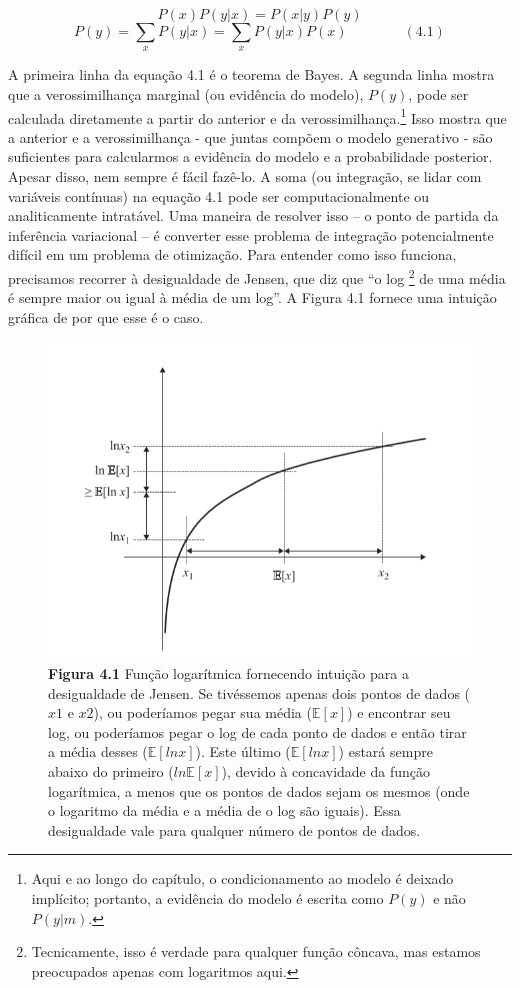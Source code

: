 \documentclass[
  12pt,
]{book}
\begin{document}
\[P(x)P(y|x) = P(x|y)P(y)\]
\[ P(y) = \sum_x P(y|x) = \sum_x P(y|x)P(x) \qquad\qquad (4.1)\]

A primeira linha da equação 4.1 é o teorema de Bayes. A segunda linha
mostra que a verossimilhança marginal (ou evidência do modelo), \(P(y)\),
pode ser calculada diretamente a partir do anterior e da
verossimilhança.\footnote{Aqui e ao longo do capítulo, o condicionamento ao modelo é deixado
  implícito; portanto, a evidência do modelo é escrita como \(P(y)\) e
  não \(P(y|m)\).} Isso mostra que a anterior e a verossimilhança -
que juntas compõem o modelo generativo - são suficientes para
calcularmos a evidência do modelo e a probabilidade posterior. Apesar
disso, nem sempre é fácil fazê-lo. A soma (ou integração, se lidar com
variáveis contínuas) na equação 4.1 pode ser computacionalmente ou
analiticamente intratável. Uma maneira de resolver isso -- o ponto de
partida da inferência variacional -- é converter esse problema de
integração potencialmente difícil em um problema de otimização. Para
entender como isso funciona, precisamos recorrer à desigualdade de
Jensen, que diz que ``o log \footnote{Tecnicamente, isso é verdade para qualquer função côncava, mas
  estamos preocupados apenas com logaritmos aqui.} de uma média é sempre maior ou igual à
média de um log''. A Figura 4.1 fornece uma intuição gráfica de por que
esse é o caso.

\begin{figure}
\centering
\includegraphics{images/Figura_4_1.png}
\caption{\textbf{Figura 4.1} Função logarítmica fornecendo intuição para a
desigualdade de Jensen. Se tivéssemos apenas dois pontos de dados (\(x1\)
e \(x2\)), ou poderíamos pegar sua média (\(\mathbb E[x]\)) e encontrar seu
log, ou poderíamos pegar o log de cada ponto de dados e então tirar a
média desses (\(\mathbb {E}[ln x]\)). Este último (\(\mathbb{E}[ln x]\))
estará sempre abaixo do primeiro (\(ln \mathbb{E}[x]\)), devido à
concavidade da função logarítmica, a menos que os pontos de dados sejam
os mesmos (onde o logaritmo da média e a média de o log são iguais).
Essa desigualdade vale para qualquer número de pontos de
dados.}
\end{figure}
\end{document}
